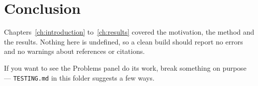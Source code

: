\chapter{Conclusion}
\label{ch:conclusion}

Chapters~\ref{ch:introduction} to~\ref{ch:results} covered the motivation,
the method and the results. Nothing here is undefined, so a clean build
should report no errors and no warnings about references or citations.

If you want to see the Problems panel do its work, break something on
purpose --- \texttt{TESTING.md} in this folder suggests a few ways.

